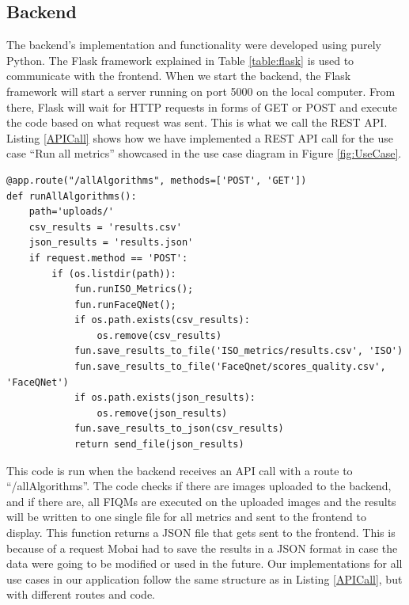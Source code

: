 \subsection{Backend}
The backend's implementation and functionality were developed using purely Python. The Flask framework explained in Table \ref{table:flask} is used to communicate with the frontend. When we start the backend, the Flask framework will start a server running on port 5000 on the local computer. From there, Flask will wait for HTTP requests in forms of GET or POST and execute the code based on what request was sent. This is what we call the REST API. Listing \ref{APICall} shows how we have implemented a REST API call for the use case ``Run all metrics'' showcased in the use case diagram in Figure \ref{fig:UseCase}. 
%
\begin{lstlisting}[style={py},caption={API call implementation},label={APICall}]
@app.route("/allAlgorithms", methods=['POST', 'GET'])
def runAllAlgorithms():
    path='uploads/'
    csv_results = 'results.csv'
    json_results = 'results.json'
    if request.method == 'POST':
        if (os.listdir(path)):
            fun.runISO_Metrics();
            fun.runFaceQNet();
            if os.path.exists(csv_results):
                os.remove(csv_results)      
            fun.save_results_to_file('ISO_metrics/results.csv', 'ISO')
            fun.save_results_to_file('FaceQnet/scores_quality.csv', 'FaceQNet')
            if os.path.exists(json_results): 
                os.remove(json_results)
            fun.save_results_to_json(csv_results)
            return send_file(json_results)
\end{lstlisting}
%
This code is run when the backend receives an API call with a route to ``/allAlgorithms''. The code checks if there are images uploaded to the backend, and if there are, all FIQMs are executed on the uploaded images and the results will be written to one single file for all metrics and sent to the frontend to display. This function returns a JSON file that gets sent to the frontend. This is because of a request Mobai had to save the results in a JSON format in case the data were going to be modified or used in the future. Our implementations for all use cases in our application follow the same structure as in Listing \ref{APICall}, but with different routes and code. 

